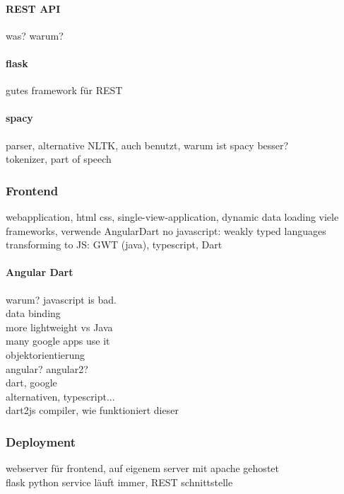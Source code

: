 \paragraph{REST API}
was? warum?

\paragraph{flask}
gutes framework für REST

\paragraph{spacy}
parser, alternative NLTK, auch benutzt, warum ist spacy besser?\\
tokenizer, part of speech

\subsubsection{Frontend}

webapplication, html css, single-view-application, dynamic data loading
viele frameworks, verwende AngularDart
no javascript: weakly typed languages transforming to JS: GWT (java), typescript, Dart

\paragraph{Angular Dart}
warum? javascript is bad.\\

data binding\\
more lightweight vs Java\\

many google apps use it\\
objektorientierung\\

angular? angular2?\\

dart, google\\
alternativen, typescript...\\

dart2js compiler, wie funktioniert dieser\\

\subsubsection{Deployment}

webserver für frontend, auf eigenem server mit apache gehostet\\
flask python service läuft immer, REST schnittstelle\\

